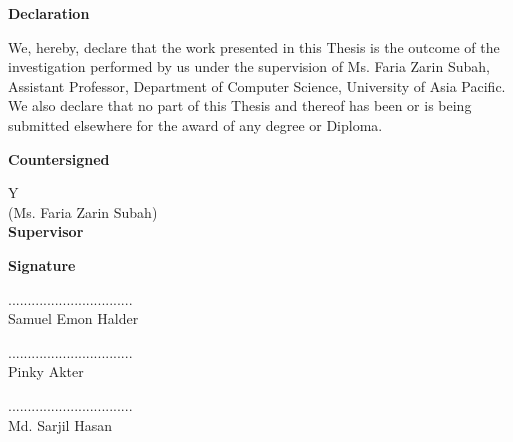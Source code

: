 \newpage
    \begin{center}
    
        \vspace*{-1cm}
        
        \vspace{0.8cm}
        
        \large
        \textbf{Declaration}\\
        \vspace{0.5cm}
        
    \end{center}
\noindent

{We, hereby, declare that the work presented in this Thesis is the outcome of the
investigation performed by us under the supervision of Ms. Faria Zarin Subah, Assistant Professor, Department of Computer Science, University of Asia Pacific. We also declare that no part of this Thesis and thereof has been or is being submitted elsewhere for the award of any degree or Diploma.}

\hspace{1cm}
\textbf{Countersigned}

\vspace{0.5cm}
\begin{table}[h]
\begin{tabular}{Y}
\hrulefill\\
\large (Ms. Faria Zarin Subah)\\ \textbf{Supervisor}
\end{tabular}
\end{table}

\hspace{11.9cm}
\textbf{Signature}

\begin{flushright}
................................\\
\large Samuel Emon Halder
\end{flushright}


\vspace{0.3cm}
\begin{flushright}
................................\\
\large Pinky Akter
\end{flushright}

\vspace{0.3cm}
\begin{flushright}
................................\\
\large Md. Sarjil Hasan
\end{flushright}

